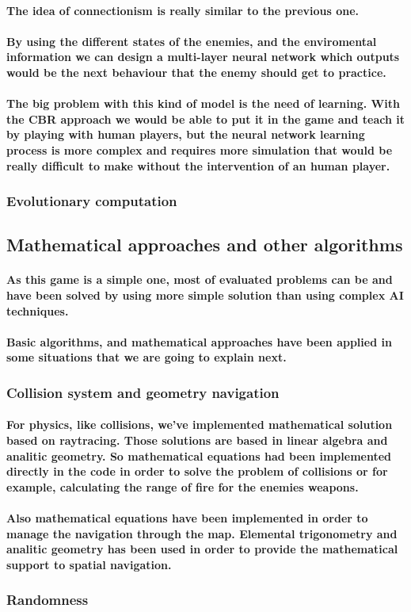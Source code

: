 \documentclass[a4paper,10pt]{article}
\newcommand{\p}[1]{\paragraph{\indent\textnormal{#1}}}
\begin{document}
      \p{The idea of connectionism is really similar to the previous one.}

      \p{By using the different states of the enemies, and the enviromental information we can design a multi-layer neural network which outputs would be the next behaviour that the enemy should get to practice.}

      \p{The big problem with this kind of model is the need of learning. With the CBR approach we would be able to put it in the game and teach it by playing with human players, but the neural network learning process is more complex and requires more simulation that would be really difficult to make without the intervention of an human player.}

  \subsubsection{Evolutionary computation}

  
  \subsection{Mathematical approaches and other algorithms}

    \p{As this game is a simple one, most of evaluated problems can be and have been solved by using more simple solution than using complex AI techniques.}

    \p{Basic algorithms, and mathematical approaches have been applied in some situations that we are going to explain next.}

    \subsubsection{Collision system and geometry navigation}

      \p{For physics, like collisions, we've implemented mathematical solution based on raytracing. Those solutions are based in linear algebra and analitic geometry. So mathematical equations had been implemented directly in the code in order to solve the problem of collisions or for example, calculating the range of fire for the enemies weapons.}

      \p{Also mathematical equations have been implemented in order to manage the navigation through the map. Elemental trigonometry and analitic geometry has been used in order to provide the mathematical support to spatial navigation.}

    \subsubsection{Randomness}
\end{document}
